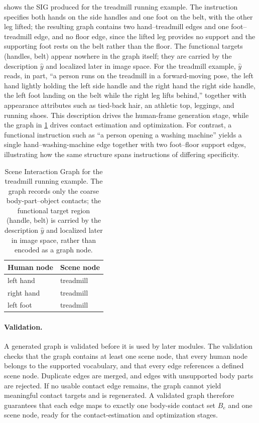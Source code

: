  shows the SIG produced for the treadmill running example. The instruction specifies both hands on the side handles and one foot on the belt, with the other leg lifted; the resulting graph contains two hand--treadmill edges and one foot--treadmill edge, and no floor edge, since the lifted leg provides no support and the supporting foot rests on the belt rather than the floor. The functional targets (handles, belt) appear nowhere in the graph itself; they are carried by the description $\hat{y}$ and localized later in image space. For the treadmill example, $\hat{y}$ reads, in part, ``a person runs on the treadmill in a forward-moving pose, the left hand lightly holding the left side handle and the right hand the right side handle, the left foot landing on the belt while the right leg lifts behind,'' together with appearance attributes such as tied-back hair, an athletic top, leggings, and running shoes. This description drives the human-frame generation stage, while the graph in \cref{tab:sig-example} drives contact estimation and optimization. For contrast, a functional instruction such as ``a person opening a washing machine'' yields a single hand--washing-machine edge together with two foot--floor support edges, illustrating how the same structure spans instructions of differing specificity.

\begin{table}[t]
  \centering
  \caption[Scene Interaction Graph for the treadmill example.]{Scene Interaction Graph for the treadmill running example. The graph records only the coarse body-part--object contacts; the functional target region (handle, belt) is carried by the description $\hat{y}$ and localized later in image space, rather than encoded as a graph node.}
  \label{tab:sig-example}
  \begin{tabularx}{\textwidth}{@{}p{}X@{}}
    \toprule
    Human node & Scene node \\
    \midrule
    left hand  & treadmill \\
    right hand & treadmill \\
    left foot  & treadmill \\
    \bottomrule
  \end{tabularx}
\end{table}

\paragraph{Validation.} A generated graph is validated before it is used by later modules. The validation checks that the graph contains at least one scene node, that every human node belongs to the supported vocabulary, and that every edge references a defined scene node. Duplicate edges are merged, and edges with unsupported body parts are rejected. If no usable contact edge remains, the graph cannot yield meaningful contact targets and is regenerated. A validated graph therefore guarantees that each edge maps to exactly one body-side contact set $B_e$ and one scene node, ready for the contact-estimation and optimization stages.


